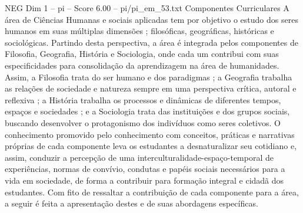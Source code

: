 \begin{textsample}{NEG Dim 1 – pi – Score 6.00 – pi/pi\_em\_53.txt}  \label{ex:f1_neg_239}
Componentes Curriculares A área de Ciências Humanas e sociais aplicadas tem por objetivo o estudo dos seres humanos em suas múltiplas dimensões ; filosóficas, geográficas, históricas e sociológicas.
Partindo desta perspectiva, a área é integrada pelos componentes de Filosofia, Geografia, História e Sociologia, onde cada um contribui com suas especificidades para consolidação da aprendizagem na área de humanidades.
Assim, a Filosofia trata do ser humano e dos paradigmas ; a Geografia trabalha as relações de sociedade e natureza sempre em uma perspectiva crítica, autoral e reflexiva ; a História trabalha os processos e dinâmicas de diferentes tempos, espaços e sociedades ; e a Sociologia trata das instituições e dos grupos sociais, buscando desenvolver o protagonismo dos indivíduos como seres coletivos.
O conhecimento promovido pelo conhecimento com conceitos, práticas e narrativas próprias de cada componente leva os estudantes a desnaturalizar seu cotidiano e, assim, conduzir a percepção de uma interculturalidade-espaço-temporal de experiências, normas de convívio, condutas e papéis sociais necessários para a vida em sociedade, de forma a contribuir para formação integral e cidadã dos estudantes.
Com fito de ressaltar a contribuição de cada componente para a área, a seguir é feita a apresentação destes e de suas abordagens específicas.

\end{textsample}
